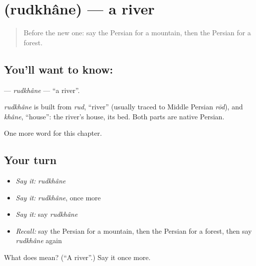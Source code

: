 \section[\texorpdfstring{\fa{رودخانه} (rudkhâne)}{رودخانه (rudkhâne)}]{ (rudkhâne) — a river}

\label{lesson:FA-C52-rudkhane}



\begin{quote}
Before the new one: say the Persian for a mountain, then the Persian for a forest.
\end{quote}

\subsection*{You'll want to know: }
\textbf{} — \emph{rudkhâne} — \textquotedblleft{}a river\textquotedblright{}.

\begin{cousinweb}
\emph{rudkhâne} is built from \emph{rud}, \textquotedblleft{}river\textquotedblright{} (usually traced to Middle Persian \emph{rōd}), and \emph{khâne}, \textquotedblleft{}house\textquotedblright{}: the river's house, its bed. Both parts are native Persian.
\end{cousinweb}

\begin{grammarlens}[title={What you've built}]
One more word for this chapter.
\end{grammarlens}

\subsection*{Your turn}
\begin{itemize}
\raggedright
  \item \emph{Say it:} \emph{rudkhâne}
  \item \emph{Say it:} \emph{rudkhâne}, once more
  \item \emph{Say it:} say \emph{rudkhâne}
  \item \emph{Recall:} say the Persian for a mountain, then the Persian for a forest, then say \emph{rudkhâne} again
\end{itemize}

\begin{tcolorbox}[breakable,colback=teal!4,colframe=teal!35!black,title={Before you move on}]
What does  mean? (\textquotedblleft{}A river\textquotedblright{}.) Say it once more.
\end{tcolorbox}
